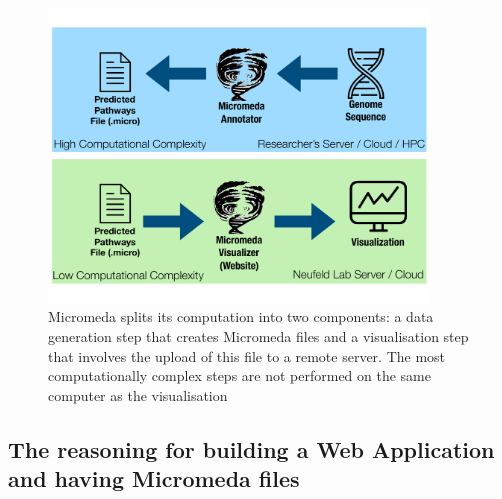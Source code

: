\begin{figure}[!ht]
  \centering
	\includegraphics[width=0.9\textwidth]{media/micromeda-file-generation.pdf}
	 \caption{Micromeda splits its computation into two components: a data generation step that creates Micromeda files and a visualisation step that involves the upload of this file to a remote server. The most computationally complex steps are not performed on the same computer as the visualisation}
	 \label{fig:micromeda-file-generation}
\end{figure}

\subsection{The reasoning for building a Web Application and having Micromeda files}

